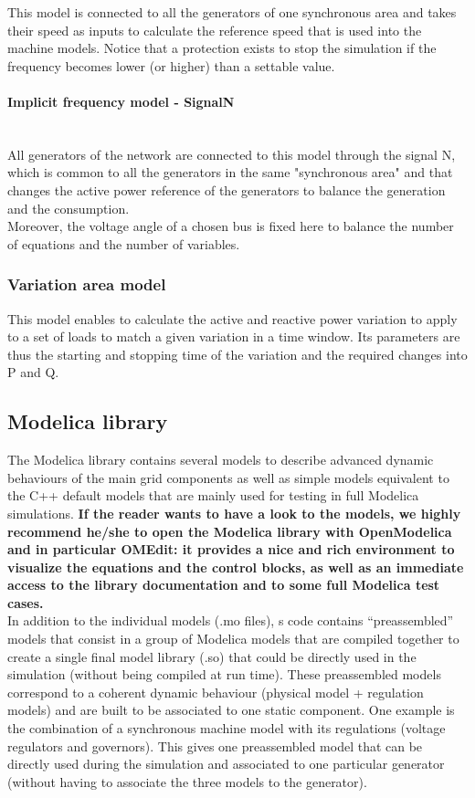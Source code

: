 \documentclass[a4paper, 12pt]{report}
\begin{document}
This model is connected to all the generators of one synchronous area and takes their speed as inputs to calculate the reference speed that is used into the machine models. Notice that a protection exists to stop the simulation if the frequency becomes lower (or higher) than a settable value.

\paragraph{Implicit frequency model - SignalN}
~~\\

All generators of the network are connected to this model through the signal N, which is common to all the generators in the same "synchronous area" and that changes the active power reference of the generators to balance the generation and the consumption. \\
Moreover, the voltage angle of a chosen bus is fixed here to balance the number of equations and the number of variables.

\subsubsection{Variation area model}

This model enables to calculate the active and reactive power variation to apply to a set of loads to match a given variation in a time window. Its parameters are thus the starting and stopping time of the variation and the required changes into P and Q.

\subsection{Modelica library}

The \Dynawo Modelica library contains several models to describe advanced dynamic behaviours of the main grid components as well as simple models equivalent to the C++ default models that are mainly used for testing in full Modelica simulations. \textbf{If the reader wants to have a look to the models, we highly recommend he/she to open the \Dynawo Modelica library with OpenModelica and in particular OMEdit: it provides a nice and rich environment to visualize the equations and the control blocks, as well as an immediate access to the library documentation and to some full Modelica test cases. } \\

In addition to the individual models (.mo files), \Dynawo\textquotesingle s code contains ``preassembled'' models that consist in a group of Modelica models that are compiled together to create a single final model library (.so) that could be directly used in the simulation (without being compiled at run time). These preassembled models correspond to a coherent dynamic behaviour (physical model + regulation models) and are built to be associated to one static component. One example is the combination of a synchronous machine model with its regulations (voltage regulators and governors). This gives one preassembled model that can be directly used during the simulation and associated to one particular generator (without having to associate the three models to the generator).
\end{document}
